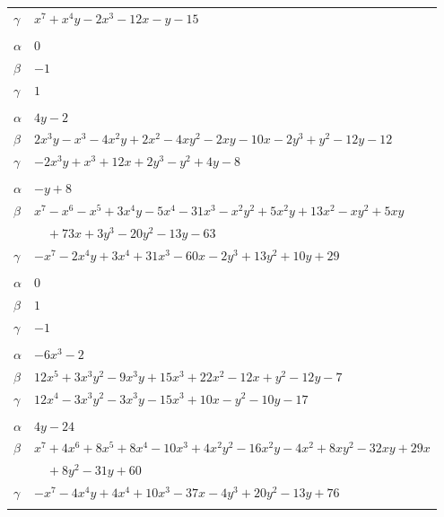 \documentclass[11pt]{article}
\begin{document}
\begin{longtable}{@{}ll@{}}
$\gamma$ & $x^{7}+x^{4}y-2x^{3}-12x-y-15$\\
\addlinespace[3pt]
\multicolumn{2}{@{}l}{$\{i,j\}=\{19,20\}$, $k_{ij}=2$}\\
$\alpha$ & $0$\\
$\beta$ & $-1$\\
$\gamma$ & $1$\\
\addlinespace[3pt]
\multicolumn{2}{@{}l}{$\{i,j\}=\{19,24\}$, $k_{ij}=2\cdot 3^{2}$}\\
$\alpha$ & $4y-2$\\
$\beta$ & $2x^{3}y-x^{3}-4x^{2}y+2x^{2}-4xy^{2}-2xy-10x-2y^{3}+y^{2}-12y-12$\\
$\gamma$ & $-2x^{3}y+x^{3}+12x+2y^{3}-y^{2}+4y-8$\\
\addlinespace[3pt]
\multicolumn{2}{@{}l}{$\{i,j\}=\{19,38\}$, $k_{ij}=2\cdot 3\cdot 7$}\\
$\alpha$ & $-y+8$\\
$\beta$ & $x^{7}-x^{6}-x^{5}+3x^{4}y-5x^{4}-31x^{3}-x^{2}y^{2}+5x^{2}y+13x^{2}-xy^{2}+5xy$\\
 & $\quad +73x+3y^{3}-20y^{2}-13y-63$\\
$\gamma$ & $-x^{7}-2x^{4}y+3x^{4}+31x^{3}-60x-2y^{3}+13y^{2}+10y+29$\\
\addlinespace[3pt]
\multicolumn{2}{@{}l}{$\{i,j\}=\{19,39\}$, $k_{ij}=1$}\\
$\alpha$ & $0$\\
$\beta$ & $1$\\
$\gamma$ & $-1$\\
\addlinespace[3pt]
\multicolumn{2}{@{}l}{$\{i,j\}=\{20,37\}$, $k_{ij}=2^{3}$}\\
$\alpha$ & $-6x^{3}-2$\\
$\beta$ & $12x^{5}+3x^{3}y^{2}-9x^{3}y+15x^{3}+22x^{2}-12x+y^{2}-12y-7$\\
$\gamma$ & $12x^{4}-3x^{3}y^{2}-3x^{3}y-15x^{3}+10x-y^{2}-10y-17$\\
\addlinespace[3pt]
\multicolumn{2}{@{}l}{$\{i,j\}=\{25,28\}$, $k_{ij}=2^{4}\cdot 7$}\\
$\alpha$ & $4y-24$\\
$\beta$ & $x^{7}+4x^{6}+8x^{5}+8x^{4}-10x^{3}+4x^{2}y^{2}-16x^{2}y-4x^{2}+8xy^{2}-32xy+29x$\\
 & $\quad +8y^{2}-31y+60$\\
$\gamma$ & $-x^{7}-4x^{4}y+4x^{4}+10x^{3}-37x-4y^{3}+20y^{2}-13y+76$\\
\addlinespace[3pt]
\multicolumn{2}{@{}l}{$\{i,j\}=\{36,27\}$, $k_{ij}=2^{2}\cdot 3^{2}\cdot 5$}\\

\end{longtable}
\end{document}
